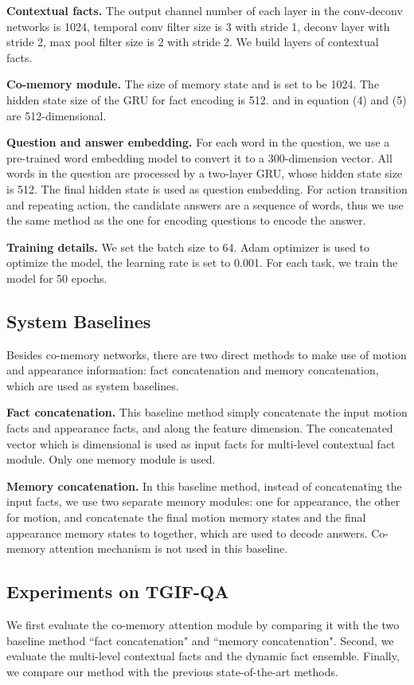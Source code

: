 \documentclass[10pt,twocolumn,letterpaper]{article}
\begin{document}
\textbf{Contextual facts.} The output channel number of each layer in the conv-deconv networks is 1024, temporal conv filter size is 3 with stride 1, deconv layer with stride 2, max pool filter size is 2 with stride 2. We build  layers of contextual facts.

\textbf{Co-memory module.} The size of memory state  and  is set to be 1024. The hidden state size of the GRU for fact encoding is 512.  and  in equation (4) and (5) are 512-dimensional.

\textbf{Question and answer embedding.} For each word in the question, we use a pre-trained word embedding model \cite{pennington2014glove} to convert it to a 300-dimension vector. All words in the question are processed by a two-layer GRU, whose hidden state size is 512. The final hidden state is used as question embedding. For action transition and repeating action, the candidate answers are a sequence of words, thus we use the same method as the one for encoding questions to encode the answer.

\textbf{Training details.} We set the batch size to 64. Adam optimizer \cite{kingma2014adam} is used to optimize the model, the learning rate is set to 0.001. For each task, we train the model for 50 epochs.

\subsection{System Baselines}
Besides co-memory networks, there are two direct methods to make use of motion and appearance information: fact concatenation and memory concatenation, which are used as system baselines.

\textbf{Fact concatenation.} This baseline method simply concatenate the input motion facts and appearance facts,  and  along the feature dimension. The concatenated vector  which is  dimensional is used as input facts for multi-level contextual fact module. Only one memory module is used.

\textbf{Memory concatenation.} In this baseline method, instead of concatenating the input facts, we use two separate memory modules: one for appearance, the other for motion, and concatenate the final motion memory states  and the final appearance memory states  to  together, which are used to decode answers. Co-memory attention mechanism is not used in this baseline.

\subsection{Experiments on TGIF-QA}
We first evaluate the co-memory attention module by comparing it with the two baseline method ``fact concatenation" and ``memory concatenation". Second, we evaluate the multi-level contextual facts and the dynamic fact ensemble.  Finally, we compare our method with the previous state-of-the-art methods.
\end{document}
